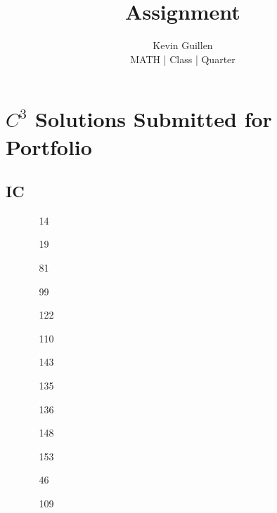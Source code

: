 \documentclass[11pt]{article}
\begin{document}
 
\title{Assignment}
\author{Kevin Guillen\\[0.5em]
MATH  | Class | Quarter}
\date{} 
\maketitle

\section{$C^{3}$ Solutions Submitted for Portfolio}
\subsection{IC}
\begin{itemize}
    \item[\text{Oct 4 Sub. }]  \begin{itemize}
        \item[14] 
        \item[19] 
    \end{itemize}
    \item[\text{Nov 1 Sub. }] \begin{itemize}
        \item[81] 
        \item[99] 
    \end{itemize}
    \item[\text{Nov 8 Sub. }]  \begin{itemize}
        \item[122] 
        \item[110] 
    \end{itemize}
    \item[\text{Nov 15 Sub. }] \begin{itemize}
        \item[143]
    \end{itemize}
    \item[\text{Nov 19 ReSub. }] \begin{itemize}
        \item[135]
        \item[136] 
    \end{itemize}
    \item[\text{Nov 22 Sub. }] \begin{itemize}
        \item[148]
        \item[153]
    \end{itemize}
    \item[\text{Dec 3 ReSub. }]\begin{itemize}
        \item[46]
        \item[109] 
    \end{itemize}

\end{itemize}
\end{document}
